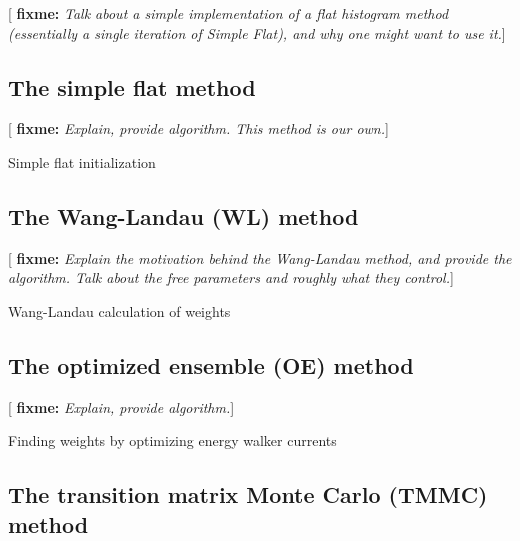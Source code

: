 \documentclass[11pt]{article}
\newcommand{\red}[1]{{\bf \color{red} #1}}
\newcommand{\fixme}[1]{[\red{fixme:} \emph{#1}]}
\begin{document}
\fixme{Talk about a simple implementation of a flat histogram method
  (essentially a single iteration of Simple Flat), and why one might
  want to use it.}

\subsection{The simple flat method}
\label{sec:simple_flat}

\fixme{Explain, provide algorithm. This method is our own.}

\begin{algorithm}[H]
  \caption{Simple flat initialization}
  \label{alg:simple_flat}
\end{algorithm}

\subsection{The Wang-Landau (WL) method}
\label{sec:wang_landau}

\fixme{Explain the motivation behind the Wang-Landau method, and
  provide the algorithm. Talk about the free parameters and roughly
  what they control.}

\begin{algorithm}[H]
  \caption{Wang-Landau calculation of weights}
  \label{alg:wang_landau}
\end{algorithm}



\subsection{The optimized ensemble (OE) method}
\label{sec:optimized_ensemble}

\fixme{Explain, provide algorithm.}

\begin{algorithm}[H]
  \caption{Finding weights by optimizing energy walker currents}
  \label{alg:optimized_ensemble}
\end{algorithm}

\subsection{The transition matrix Monte Carlo (TMMC) method}
\label{sec:tmmc}
\end{document}
